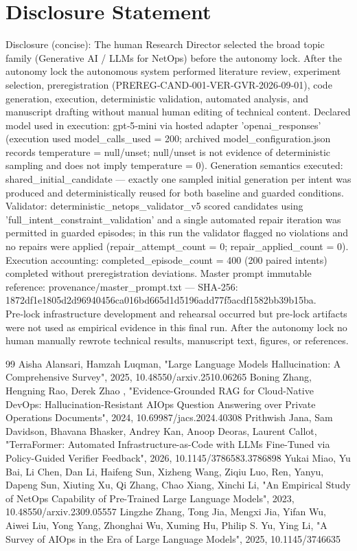 \documentclass[conference]{IEEEtran}
\begin{document}
\section*{Disclosure Statement}
Disclosure (concise): The human Research Director selected the broad topic family (Generative AI / LLMs for NetOps) before the autonomy lock. After the autonomy lock the autonomous system performed literature review, experiment selection, preregistration (PREREG‑CAND‑001‑VER‑GVR‑2026‑09‑01), code generation, execution, deterministic validation, automated analysis, and manuscript drafting without manual human editing of technical content. Declared model used in execution: gpt‑5‑mini via hosted adapter 'openai\_responses' (execution used model\_calls\_used = 200; archived model\_configuration.json records temperature = null/unset; null/unset is not evidence of deterministic sampling and does not imply temperature = 0). Generation semantics executed: shared\_initial\_candidate --- exactly one sampled initial generation per intent was produced and deterministically reused for both baseline and guarded conditions. Validator: deterministic\_netops\_validator\_v5 scored candidates using 'full\_intent\_constraint\_validation' and a single automated repair iteration was permitted in guarded episodes; in this run the validator flagged no violations and no repairs were applied (repair\_attempt\_count = 0; repair\_applied\_count = 0). Execution accounting: completed\_episode\_count = 400 (200 paired intents) completed without preregistration deviations. Master prompt immutable reference: provenance/master\_prompt.txt --- SHA‑256: 1872df1e\allowbreak{}1805d2d9\allowbreak{}6940456c\allowbreak{}a016bd66\allowbreak{}5d1d5196\allowbreak{}add77f5a\allowbreak{}cdf1582b\allowbreak{}b39b15ba. Pre‑lock infrastructure development and rehearsal occurred but pre‑lock artifacts were not used as empirical evidence in this final run. After the autonomy lock no human manually rewrote technical results, manuscript text, figures, or references.

\begin{thebibliography}{99}
 Aisha Alansari, Hamzah Luqman, "Large Language Models Hallucination: A Comprehensive Survey", 2025, 10.48550/arxiv.2510.06265
 Boning Zhang, Hengning Rao, Derek Zhao , "Evidence-Grounded RAG for Cloud-Native DevOps: Hallucination-Resistant AIOps Question Answering over Private Operations Documents", 2024, 10.69987/jacs.2024.40308
 Prithwish Jana, Sam Davidson, Bhavana Bhasker, Andrey Kan, Anoop Deoras, Laurent Callot, "TerraFormer: Automated Infrastructure-as-Code with LLMs Fine-Tuned via Policy-Guided Verifier Feedback", 2026, 10.1145/3786583.3786898
 Yukai Miao, Yu Bai, Li Chen, Dan Li, Haifeng Sun, Xizheng Wang, Ziqiu Luo, Ren, Yanyu, Dapeng Sun, Xiuting Xu, Qi Zhang, Chao Xiang, Xinchi Li, "An Empirical Study of NetOps Capability of Pre-Trained Large Language Models", 2023, 10.48550/arxiv.2309.05557
 Lingzhe Zhang, Tong Jia, Mengxi Jia, Yifan Wu, Aiwei Liu, Yong Yang, Zhonghai Wu, Xuming Hu, Philip S. Yu, Ying Li, "A Survey of AIOps in the Era of Large Language Models", 2025, 10.1145/3746635
\end{thebibliography}
\end{document}
